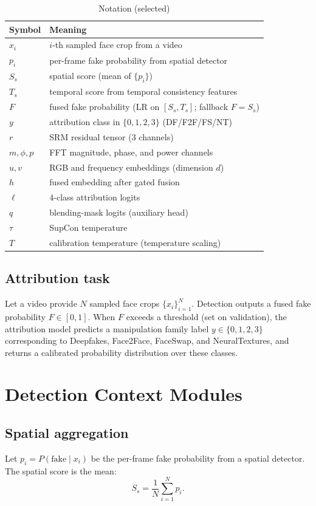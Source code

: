 \documentclass[conference]{IEEEtran}
\begin{document}
\begin{table}[t]
\caption{Notation (selected)}
\label{tab:notation}
\centering
\begin{tabular}{@{}ll@{}}
\toprule
Symbol & Meaning \\ \midrule
$x_i$ & $i$-th sampled face crop from a video \\
$p_i$ & per-frame fake probability from spatial detector \\
$S_s$ & spatial score (mean of $\{p_i\}$) \\
$T_s$ & temporal score from temporal consistency features \\
$F$ & fused fake probability (LR on $[S_s,T_s]$; fallback $F=S_s$) \\
$y$ & attribution class in $\{0,1,2,3\}$ (DF/F2F/FS/NT) \\
$r$ & SRM residual tensor (3 channels) \\
$m,\phi,p$ & FFT magnitude, phase, and power channels \\
$u,v$ & RGB and frequency embeddings (dimension $d$) \\
$h$ & fused embedding after gated fusion \\
$\ell$ & 4-class attribution logits \\
$q$ & blending-mask logits (auxiliary head) \\
$\tau$ & SupCon temperature \\
$T$ & calibration temperature (temperature scaling) \\
\bottomrule
\end{tabular}
\end{table}

\subsection{Attribution task}
Let a video provide $N$ sampled face crops $\{x_i\}_{i=1}^{N}$. Detection outputs a fused fake probability $F \in [0,1]$. When $F$ exceeds a threshold (set on validation), the attribution model predicts a manipulation family label $y \in \{0,1,2,3\}$ corresponding to Deepfakes, Face2Face, FaceSwap, and NeuralTextures, and returns a calibrated probability distribution over these classes.

\section{Detection Context Modules}
\subsection{Spatial aggregation}
Let $p_i = P(\mathrm{fake}\mid x_i)$ be the per-frame fake probability from a spatial detector. The spatial score is the mean:
\begin{equation}
S_s = \frac{1}{N}\sum_{i=1}^{N} p_i.
\end{equation}
\end{document}

